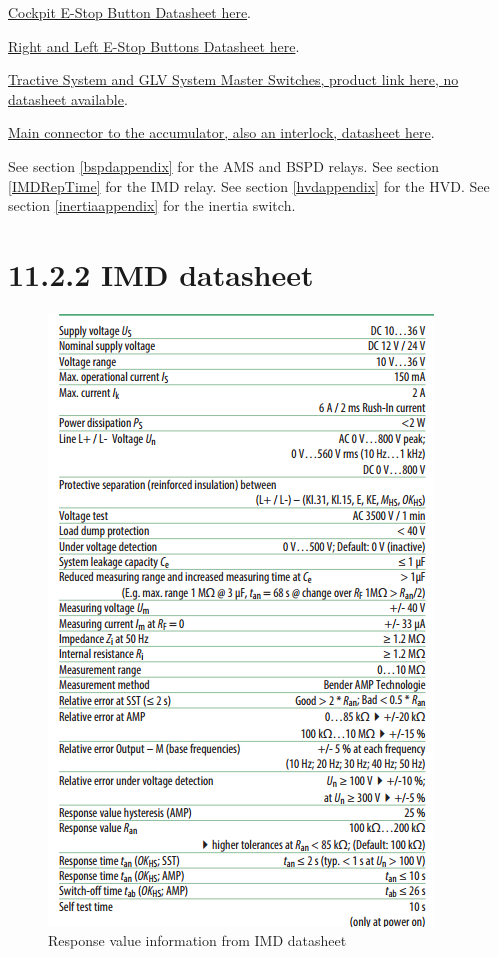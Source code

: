 \documentclass{article}
\begin{document}
\href{http://products.eao.com/index.php?IdTreeGroup=2344&IdProduct=48667&lang=en}{Cockpit E-Stop Button Datasheet here}.

\href{http://products.eao.com/index.php?IdTreeGroup=2344&IdProduct=48533&lang=en}{Right and Left E-Stop Buttons Datasheet here}.

\href{http://www.amazon.com/Volt-Battery-Disconnect-Kill-Switch/dp/B007O0BBFM}{Tractive System and GLV System Master Switches, product link here, no datasheet available}.

\href{http://www.mouser.com/pdfdocs/9876510101.PDF}{Main connector to the accumulator, also an interlock, datasheet here}.

See section \ref{bspdappendix} for the AMS and BSPD relays.
See section \ref{IMDRepTime} for the IMD relay.
See section \ref{hvdappendix} for the HVD.
See section \ref{inertiaappendix} for the inertia switch.

\section*{11.2.2 IMD datasheet} \label{IMDRepTime}
\begin{figure}[H]
    \centering
    \includegraphics[width=0.45 \textheight]{IMD_datasheet_snip}
    \caption{Response value information from IMD datasheet}
    \label{IMDresponsetime}
\end{figure}
\end{document}
